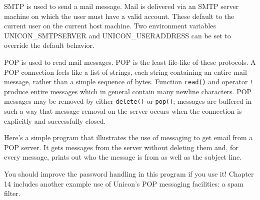 SMTP is used to send a mail message. Mail is delivered via
an SMTP server machine on which the user must have a valid account.
These default to the current user on the current host machine. Two
environment variables UNICON\_SMTPSERVER and UNICON\_USERADDRESS can be
set to override the default behavior.

POP is used to read mail messages. POP is the least file-like
of these protocols. A POP connection feels like a list of strings, each
string containing an entire mail message, rather than a simple sequence
of bytes. Function \texttt{read()} and operator \texttt{!} produce
entire messages which in general contain many newline characters. POP
messages may be removed by either \texttt{delete()} or \texttt{pop()};
messages are buffered in such a way that message removal on the server
occurs when the connection is explicitly and successfully closed.

Here's a simple program that illustrates the use of
messaging to get email from a POP server. It gets messages from the
server without deleting them and, for every message, prints out who the
message is from as well as the subject line.


\noindent
You should improve the password handling in this program if you use it!
Chapter 14 includes another example use of
Unicon's POP messaging facilities: a spam filter.

